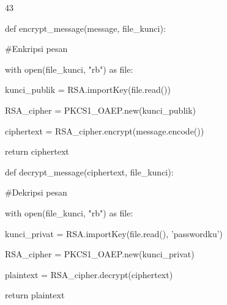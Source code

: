\documentclass{article}
\begin{document}

43

def encrypt\_message(message, file\_kunci):

    \#Enkripsi pesan

    with open(file\_kunci, "rb") as file:

         kunci\_publik = RSA.importKey(file.read())


    RSA\_cipher = PKCS1\_OAEP.new(kunci\_publik)

    ciphertext = RSA\_cipher.encrypt(message.encode())

    return ciphertext


def decrypt\_message(ciphertext, file\_kunci):

     \#Dekripsi pesan

    with open(file\_kunci, "rb") as file:

         kunci\_privat = RSA.importKey(file.read(), 'passwordku')


    RSA\_cipher = PKCS1\_OAEP.new(kunci\_privat)

    plaintext = RSA\_cipher.decrypt(ciphertext)

    return plaintext
\end{document}
